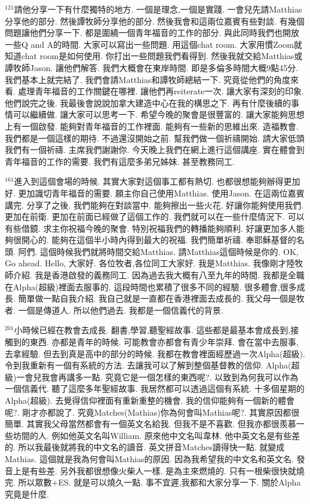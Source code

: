 \documentclass{book}
\begin{document}
$^{121}$請他分享一下有什麼獨特的地方.
一個是理念,一個是實踐.
一會兒先請Matthias分享他的部分.
然後譚牧師分享他的部分.
然後我會和這兩位嘉賓有些對談.
有幾個問題讓他們分享一下.
都是圍繞一個青年福音的工作的部分.
與此同時我們也開放一些Q and A的時間.
大家可以寫出一些問題.
用這個chat room.
大家用慣Zoom就知道chat room是如何使用.
你打出一些問題我們看得到.
然後我就交給Matthias或譚牧師Jason.
讓他們解答.
我們大概會在東岸時間.
即是多倫多時間大概9點45分.
我們基本上就完結了.
我們會請Matthias和譚牧師總結一下.
究竟從他們的角度來看.
處理青年福音的工作關鍵在哪裡.
讓他們再reiterate一次.
讓大家有深刻的印象.
他們說完之後.
我最後會說說加拿大建造中心在我的構思之下.
再有什麼後續的事情可以繼續做.
讓大家可以思考一下.
希望今晚的聚會是很豐富的.
讓大家能夠思想上有一個啟發.
能夠對青年福音的工作裡面.
能夠有一些新的思維出來.
造福教會.
我們都是一個這樣的期待.
不過還沒開始之前.
幫我們做一個祈禱開始.
請大家低頭我們有一個祈禱.
主席我們謝謝你.
今天晚上我們在網上進行這個講座.
實在體會到青年福音的工作的需要.
我們有這麼多弟兄姊妹.
甚至教務同工.

$^{161}$進入到這個會場的時候.
其實大家對這個事工都有熱切.
也都很想能夠辦得更加好.
更加識切青年福音的需要.
願主你自己使用Matthias.
使用Jason.
在這兩位嘉賓講完.
分享了之後.
我們能夠在對談當中.
能夠擦出一些火花.
好讓你能夠使用我們.
更加在前衛.
更加在前面已經做了這個工作的.
我們就可以在一些什麼情況下.
可以有些借鏡.
求主你祝福今晚的聚會.
特別祝福我們的轉播能夠順利.
好讓更加多人能夠很開心的.
能夠在這個半小時內得到最大的祝福.
我們簡單祈禱.
奉耶穌基督的名頭.
阿們.
這個時候我們就將時間交給Matthias.
請Matthias這個時候是你的.
OK, Go ahead.
Hello, 大家好.
各位牧者,各位同工大家好.
我是Matthias.
我像剛才陸牧師介紹.
我是香港啟發的義務同工.
因為過去我大概有八至九年的時間.
我都是全職在Alpha(超級)裡面去服事的.
這段時間也累積了很多不同的經驗.
很多體會,很多成長.
簡單做一點自我介紹.
我自己就是一直都在香港裡面去成長的.
我父母一個是牧者.
一個是傳道人.
所以他們過去.
我都是一個信義代的背景.

$^{201}$小時候已經在教會去成長.
翻書,學習,聽聖經故事.
這些都是最基本會成長到,接觸到的東西.
亦都是青年的時候.
可能教會亦都會有青少年崇拜.
會在當中去服事,去拿經驗.
但去到真是高中的部分的時候.
我都在教會裡面經歷過一次Alpha(超級).
令到我重新有一個有系統的方法.
去讓我可以了解到整個基督教的信仰.
Alpha(超級)一會兒我會再講多一點.
究竟它是一個怎樣的東西呢?.
以致到為何我可以作為一個信義代.
聽了這麼多年聖經故事.
我居然都可以透過這個有系統.
十多個星期的Alpha(超級).
去覺得信仰裡面有重新重整的機會.
我的信仰能夠有一個新的體會呢?.
剛才亦都說了.
究竟Matches(Mathias)你為何會叫Mathias呢?.
其實原因都很簡單.
其實我父母當然都會有一個英文名給我.
但我不是不喜歡.
但我亦都很羨慕一些坊間的人.
例如他英文名叫William.
原來他中文名叫韋林.
他中英文名是有些差的.
所以我最後就將我的中文名的讀音.
英文拼音Matches讀得快一點.
就變成Mathias.
這個就是我為何會叫Mathias的原因.
因為我希望我的中文名和英文名.
發音上是有些差.
另外我都很想像火柴人一樣.
是為主來燃燒的.
只有一根柴很快就燒完.
所以眾數+ES.
就是可以燒久一點.
事不宜遲,我都和大家分享一下.
關於Alpha究竟是什麼.
\end{document}
